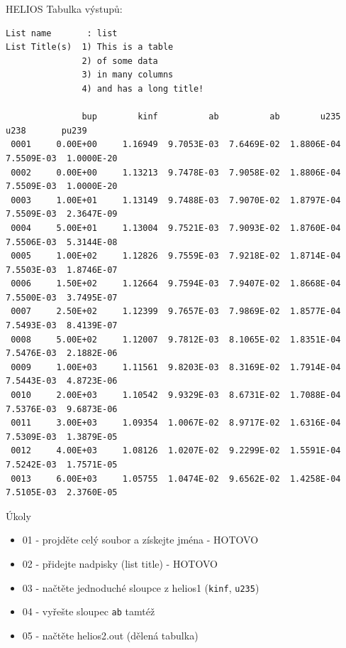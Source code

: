 \documentclass{beamer}
\begin{document}
\begin{frame}[fragile]{HELIOS}
  Tabulka výstupů:
  \scriptsize
  \begin{verbatim}
List name       : list
List Title(s)  1) This is a table
               2) of some data
               3) in many columns
               4) and has a long title!

               bup        kinf          ab          ab        u235        u238       pu239
 0001     0.00E+00     1.16949  9.7053E-03  7.6469E-02  1.8806E-04  7.5509E-03  1.0000E-20
 0002     0.00E+00     1.13213  9.7478E-03  7.9058E-02  1.8806E-04  7.5509E-03  1.0000E-20
 0003     1.00E+01     1.13149  9.7488E-03  7.9070E-02  1.8797E-04  7.5509E-03  2.3647E-09
 0004     5.00E+01     1.13004  9.7521E-03  7.9093E-02  1.8760E-04  7.5506E-03  5.3144E-08
 0005     1.00E+02     1.12826  9.7559E-03  7.9218E-02  1.8714E-04  7.5503E-03  1.8746E-07
 0006     1.50E+02     1.12664  9.7594E-03  7.9407E-02  1.8668E-04  7.5500E-03  3.7495E-07
 0007     2.50E+02     1.12399  9.7657E-03  7.9869E-02  1.8577E-04  7.5493E-03  8.4139E-07
 0008     5.00E+02     1.12007  9.7812E-03  8.1065E-02  1.8351E-04  7.5476E-03  2.1882E-06
 0009     1.00E+03     1.11561  9.8203E-03  8.3169E-02  1.7914E-04  7.5443E-03  4.8723E-06
 0010     2.00E+03     1.10542  9.9329E-03  8.6731E-02  1.7088E-04  7.5376E-03  9.6873E-06
 0011     3.00E+03     1.09354  1.0067E-02  8.9717E-02  1.6316E-04  7.5309E-03  1.3879E-05
 0012     4.00E+03     1.08126  1.0207E-02  9.2299E-02  1.5591E-04  7.5242E-03  1.7571E-05
 0013     6.00E+03     1.05755  1.0474E-02  9.6562E-02  1.4258E-04  7.5105E-03  2.3760E-05
  \end{verbatim}
\end{frame}


\begin{frame}{Úkoly}
  \begin{itemize}
    \item 01 - projděte celý soubor a získejte jména - HOTOVO
    \item 02 - přidejte nadpisky (list title) - HOTOVO
    \item 03 - načtěte jednoduché sloupce z helios1 (\texttt{kinf}, \texttt{u235})
    \item 04 - vyřešte sloupec \texttt{ab} tamtéž 
    \item 05 - načtěte helios2.out (dělená tabulka)
  \end{itemize}
\end{frame}
\end{document}
